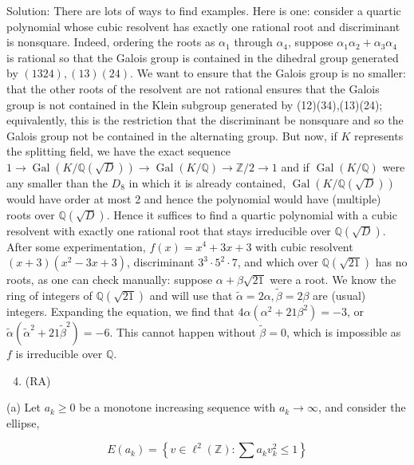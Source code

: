 \documentclass[10pt]{article}
\begin{document}
Solution: There are lots of ways to find examples. Here is one: consider a quartic polynomial whose cubic resolvent has exactly one rational root and discriminant is nonsquare. Indeed, ordering the roots as $\alpha_{1}$ through $\alpha_{4}$, suppose $\alpha_{1} \alpha_{2}+\alpha_{3} \alpha_{4}$ is rational so that the Galois group is contained in the dihedral group generated by $(1324),(13)(24)$. We want to ensure that the Galois group is no smaller: that the other roots of the resolvent are not rational ensures that the Galois group is not contained in the Klein subgroup generated by (12)(34),(13)(24); equivalently, this is the restriction that the discriminant be nonsquare and so the Galois group not be contained in the alternating group. But now, if $K$ represents the splitting field, we have the exact sequence $1 \rightarrow \operatorname{Gal}(K / \mathbb{Q}(\sqrt{D})) \rightarrow \operatorname{Gal}(K / \mathbb{Q}) \rightarrow \mathbb{Z} / 2 \rightarrow 1$ and if $\operatorname{Gal}(K / \mathbb{Q})$ were any smaller than the $D_{8}$ in which it is already contained, $\operatorname{Gal}(K / \mathbb{Q}(\sqrt{D}))$ would have order at most 2 and hence the polynomial would have (multiple) roots over $\mathbb{Q}(\sqrt{D})$. Hence it suffices to find a quartic polynomial with a cubic resolvent with exactly one rational root that stays irreducible over
$\mathbb{Q}(\sqrt{D})$. After some experimentation, $f(x)=x^{4}+3 x+3$ with cubic resolvent $(x+3)\left(x^{2}-3 x+3\right)$, discriminant $3^{3} \cdot 5^{2} \cdot 7$, and which over $\mathbb{Q}(\sqrt{21})$ has no roots, as one can check manually: suppose $\alpha+\beta \sqrt{21}$ were a root. We know the ring of integers of $\mathbb{Q}(\sqrt{21})$ and will use that $\tilde{\alpha}=2 \alpha, \tilde{\beta}=2 \beta$ are (usual) integers. Expanding the equation, we find that $4 \alpha\left(\alpha^{2}+21 \beta^{2}\right)=-3$, or $\tilde{\alpha}\left(\tilde{\alpha}^{2}+21 \tilde{\beta}^{2}\right)=-6$. This cannot happen without $\tilde{\beta}=0$, which is impossible as $f$ is irreducible over $\mathbb{Q}$.

\begin{enumerate}
  \setcounter{enumi}{3}
  \item (RA)
\end{enumerate}

(a) Let $a_{k} \geq 0$ be a monotone increasing sequence with $a_{k} \rightarrow \infty$, and consider the ellipse,

$$
E\left(a_{k}\right)=\left\{v \in \ell^{2}(\mathbb{Z}): \sum a_{k} v_{k}^{2} \leq 1\right\}
$$
\end{document}

